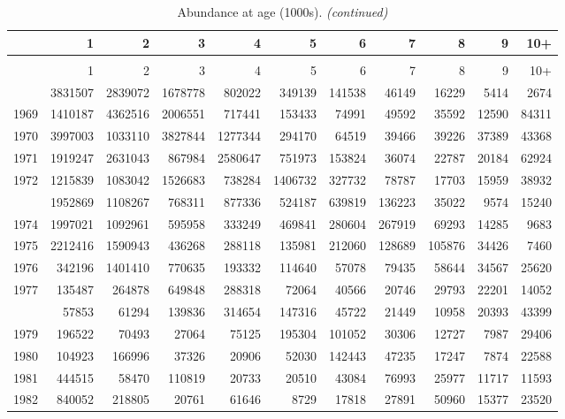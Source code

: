 \documentclass[
]{article}
\begin{document}
\begin{longtable}[t]{lrrrrrrrrrr}
\caption{\label{tab:NAA-table}Abundance at age (1000s).}\\
\toprule
  & 1 & 2 & 3 & 4 & 5 & 6 & 7 & 8 & 9 & 10+\\
\midrule
\endfirsthead
\caption[]{Abundance at age (1000s). \textit{(continued)}}\\
\toprule
  & 1 & 2 & 3 & 4 & 5 & 6 & 7 & 8 & 9 & 10+\\
\midrule
\endhead

\endfoot
\bottomrule
\endlastfoot
1968 & 3831507 & 2839072 & 1678778 & 802022 & 349139 & 141538 & 46149 & 16229 & 5414 & 2674\\
1969 & 1410187 & 4362516 & 2006551 & 717441 & 153433 & 74991 & 49592 & 35592 & 12590 & 84311\\
1970 & 3997003 & 1033110 & 3827844 & 1277344 & 294170 & 64519 & 39466 & 39226 & 37389 & 43368\\
1971 & 1919247 & 2631043 & 867984 & 2580647 & 751973 & 153824 & 36074 & 22787 & 20184 & 62924\\
1972 & 1215839 & 1083042 & 1526683 & 738284 & 1406732 & 327732 & 78787 & 17703 & 15959 & 38932\\
\addlinespace
1973 & 1952869 & 1108267 & 768311 & 877336 & 524187 & 639819 & 136223 & 35022 & 9574 & 15240\\
1974 & 1997021 & 1092961 & 595958 & 333249 & 469841 & 280604 & 267919 & 69293 & 14285 & 9683\\
1975 & 2212416 & 1590943 & 436268 & 288118 & 135981 & 212060 & 128689 & 105876 & 34426 & 7460\\
1976 & 342196 & 1401410 & 770635 & 193332 & 114640 & 57078 & 79435 & 58644 & 34567 & 25620\\
1977 & 135487 & 264878 & 649848 & 288318 & 72064 & 40566 & 20746 & 29793 & 22201 & 14052\\
\addlinespace
1978 & 57853 & 61294 & 139836 & 314654 & 147316 & 45722 & 21449 & 10958 & 20393 & 43399\\
1979 & 196522 & 70493 & 27064 & 75125 & 195304 & 101052 & 30306 & 12727 & 7987 & 29406\\
1980 & 104923 & 166996 & 37326 & 20906 & 52030 & 142443 & 47235 & 17247 & 7874 & 22588\\
1981 & 444515 & 58470 & 110819 & 20733 & 20510 & 43084 & 76993 & 25977 & 11717 & 11593\\
1982 & 840052 & 218805 & 20761 & 61646 & 8729 & 17818 & 27891 & 50960 & 15377 & 23520\\

\end{longtable}
\end{document}
